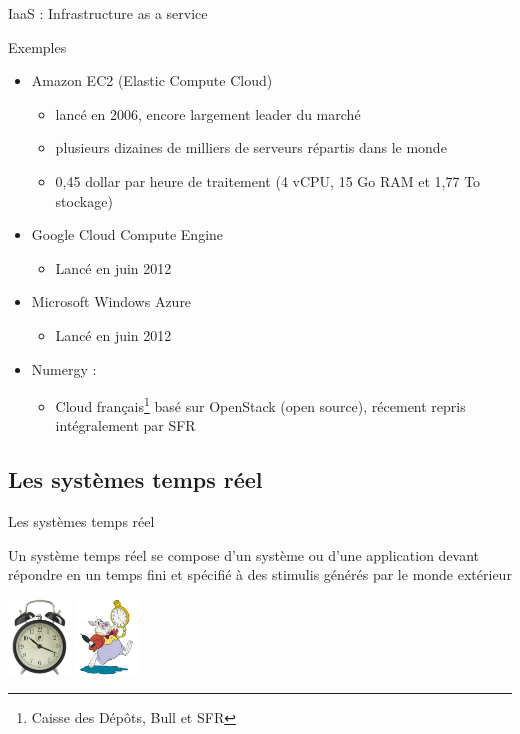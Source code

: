 \begin{frame}{IaaS : Infrastructure as a service}
\begin{exampleblock}{Exemples}
\begin{itemize}
\item Amazon EC2 (Elastic Compute Cloud)
\begin{itemize}
\item lancé en 2006, encore largement leader du marché
\item plusieurs dizaines de milliers de serveurs répartis dans le monde
\item 0,45 dollar par heure de traitement (4 vCPU, 15 Go RAM et 1,77 To stockage)
\end{itemize}

\item Google Cloud Compute Engine
\begin{itemize}
\item Lancé en juin 2012
\end{itemize}

\item Microsoft Windows Azure
\begin{itemize}
\item Lancé en juin 2012
\end{itemize}

\item Numergy : \begin{itemize}
\item Cloud français\footnote{Caisse des Dépôts, Bull et SFR} basé sur OpenStack (open source), récement repris intégralement par SFR
\end{itemize}

\end{itemize}
\end{exampleblock}
\end{frame}


\subsection{Les systèmes temps réel}
\begin{frame}{Les systèmes temps réel}
\begin{definition}
Un système temps réel se compose d'un système ou d'une application
devant répondre en un temps fini et spécifié à des stimulis générés
par le monde extérieur
\end{definition}
\includegraphics[height=2cm]{../illustration/reveil-ikea.jpg}
\includegraphics[height=2cm]{../illustration/lapin-alice-merveilles.png}
\end{frame}

